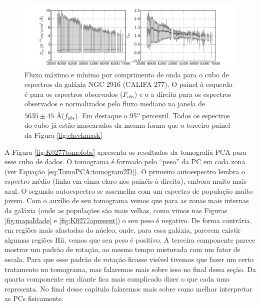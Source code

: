 \begin{figure}
	\includegraphics[width=1.\textwidth]{figuras/K0277-exampleSpectraFill.pdf}
    \caption[Máximo e mínimo de fluxo dos espectros da gal\'axia NGC 2916 (CALIFA 277).] 
    {Fluxo máximo e mínimo por comprimento de onda para o cubo de espectros da galáxia NGC 2916 (CALIFA 277). O painel à
    esquerda é para os espectros observados ($F_{obs}$) e o a direita para os espectros observados e normalizados pelo
    fluxo mediano na janela de $5635 \pm 45$ \AA ($f_{obs}$). Em destaque o 95\textsuperscript{\underline{o}} percentil.
    Todos os espectros do cubo já estão mascarados da mesma forma que o terceiro painel da Figura \ref{fig:checkmask}}
    \label{fig:K0277ExampleSpectraFill}
\end{figure}

A Figura \ref{fig:K0277tomofobs} apresenta os resultados da tomografia PCA para esse cubo de dados. O tomograma é
formado pelo ``peso'' da PC em cada zona (ver Equação \ref{eq:TomoPCA:tomogram2D}). O primeiro autoespectro lembra o
espectro médio (linha em cinza claro nos painéis à direita), embora muito mais azul. O segundo autoespectro se assemelha
com um espectro de população muito jovem. Com o auxílio de seu tomograma vemos que para as zonas mais internas da
galáxia (onde as populações são mais velhas, como vimos nas Figuras \ref{fig:mapaIdade} e \ref{fig:K0277apresent}) o seu
peso é negativo. De forma contrária, em regiões mais afastadas do núcleo, onde, para essa galáxia, parecem existir
algumas regiões H{\sc ii}, vemos que seu peso é positivo. A terceira componente parece mostrar um padrão de rotação, ao
mesmo tempo misturada com um fator de escala. Para que esse padrão de rotação ficasse visível tivemos que fazer um certo
tratamento no tomograma, mas falaremos mais sobre isso no final dessa seção. Da quarta componente em diante fica mais
complicado dizer o que cada uma representa. No final desse capítulo falaremos mais sobre como melhor interpretar as PCs
fisicamente.

